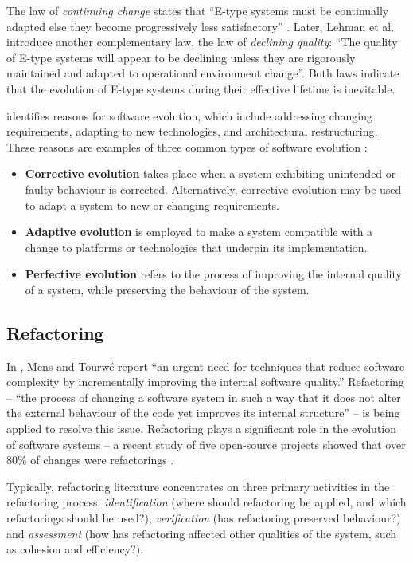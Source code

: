 The law of \textit{continuing change} states that ``E-type systems must be continually adapted else they become progressively less satisfactory'' \cite{lehman78programs}. Later, Lehman et al. \cite{lehman96laws} introduce another complementary law, the law of \textit{declining quality}: ``The quality of E-type systems will appear to be declining unless they are rigorously maintained and adapted to operational environment change''. Both laws indicate that the evolution of E-type systems during their effective lifetime is inevitable. 

\cite{sjoberg93quantifying} identifies reasons for software evolution, which include addressing changing requirements, adapting to new technologies, and architectural restructuring. These reasons are examples of three common types of software evolution \cite[ch. 21]{sommerville06software}:

\begin{itemize}
 \item \textbf{Corrective evolution} takes place when a system exhibiting unintended or faulty behaviour is corrected. Alternatively, corrective evolution may be used to adapt a system to new or changing requirements. 
 \item \textbf{Adaptive evolution} is employed to make a system compatible with a change to platforms or technologies that underpin its implementation.
 \item \textbf{Perfective evolution} refers to the process of improving the internal quality of a system, while preserving the behaviour of the system. 
\end{itemize}


\subsection{Refactoring}
\label{LitReview:SoftwareEvo:Refactoring}
In \cite{mens04survey}, Mens and Tourw\'{e} report ``an urgent need for techniques that reduce software complexity by incrementally improving the internal software quality.'' Refactoring -- ``the process of changing a software system in such a way that it does not alter the external behaviour of the code yet improves its internal structure'' \cite[pg. xvi]{fowler99refactoring} -- is being applied to resolve this issue. Refactoring plays a significant role in the evolution of software systems -- a recent study of five open-source projects showed that over 80\% of changes were refactorings \cite{dig06apis}.

Typically, refactoring literature concentrates on three primary activities in the refactoring process: \emph{identification} (where should refactoring be applied, and which refactorings should be used?), \emph{verification} (has refactoring preserved behaviour?) and \emph{assessment} (how has refactoring affected other qualities of the system, such as cohesion and efficiency?).

